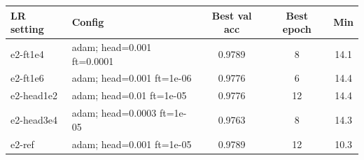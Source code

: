 \begin{tabular}{llccc}
\toprule
LR setting & Config & Best val acc & Best epoch & Min \\
\midrule
e2-ft1e4 & adam; head=0.001 ft=0.0001 & 0.9789 & 8 & 14.1\\
e2-ft1e6 & adam; head=0.001 ft=1e-06 & 0.9776 & 6 & 14.4\\
e2-head1e2 & adam; head=0.01 ft=1e-05 & 0.9776 & 12 & 14.4\\
e2-head3e4 & adam; head=0.0003 ft=1e-05 & 0.9763 & 8 & 14.3\\
e2-ref & adam; head=0.001 ft=1e-05 & 0.9789 & 12 & 10.3 \\
\bottomrule
\end{tabular}
